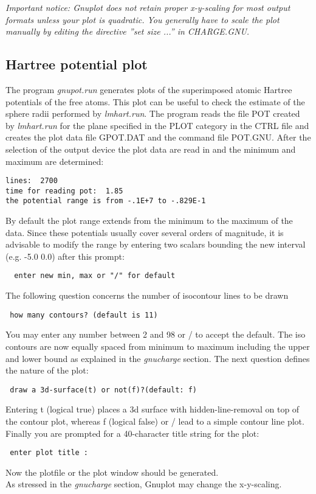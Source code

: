 \documentclass[aps,twocolumn,a4]{revtex4}
\begin{document}
{\it Important notice: Gnuplot does not retain proper x-y-scaling for most
     output formats unless your plot is quadratic. You generally have
     to scale the plot manually by editing the directive ''set size ...''
     in CHARGE.GNU.}

\subsection {Hartree potential plot}
\label{hartplot}

The program {\it gnupot.run} generates plots of the superimposed atomic
Hartree potentials of the free atoms. This plot can be useful to check
the estimate of the sphere radii performed by {\it lmhart.run}.
The program reads the file POT created by {\it lmhart.run} for the plane
specified in the PLOT category in the CTRL file and creates the plot data
file GPOT.DAT and the command file POT.GNU.
After the selection of the output device the plot data are read in and the
minimum and maximum are determined:
\begin{verbatim}
lines:  2700
time for reading pot:  1.85
the potential range is from -.1E+7 to -.829E-1
\end{verbatim}
By default the plot range extends from the minimum to the maximum of the data.
Since these potentials usually cover several orders of magnitude, it is
advisable to modify the range by entering two scalars bounding the
new interval (e.g. -5.0 0.0) after this prompt:
\begin{verbatim}
  enter new min, max or "/" for default
\end{verbatim}
The following question concerns the number of isocontour lines to be drawn
\begin{verbatim}
 how many contours? (default is 11)
\end{verbatim}
You may enter any number between 2 and 98 or / to accept the default.
The iso contours are now equally spaced from minimum to maximum including
the upper and lower bound as explained in the {\it gnucharge} section.
The next question defines the nature of the plot:
\begin{verbatim}
 draw a 3d-surface(t) or not(f)?(default: f)
\end{verbatim}
Entering t (logical true) places a 3d surface with hidden-line-removal on top
of the contour plot, whereas f (logical false) or / lead to a simple
contour line plot.
Finally you are prompted for a 40-character title string for the plot:
\begin{verbatim}
 enter plot title :
\end{verbatim}
Now the plotfile or the plot window should be generated.\\
As stressed in the {\it gnucharge} section, Gnuplot may change the x-y-scaling.
\end{document}

